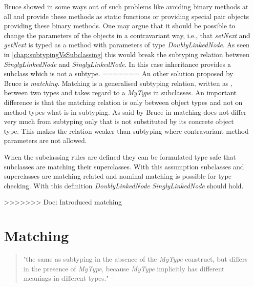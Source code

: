 Bruce showed in \cite{bruce_binary_1995} some ways out of such problems
like avoiding binary methods at all and provide these methods as static
functions or providing special pair objects providing these binary
methods. One may argue that it should be possible to change the parameters
of the objects in a contravariant way, i.e., that \emph{setNext}
and \emph{getNext} is typed as a method with parameters of type
\emph{DoublyLinkedNode}. As seen in \autoref{chap:subtypingVsSubclassing}
this would break the subtyping relation between \emph{SinglyLinkedNode}
and \emph{SinglyLinkedNode}. In this case inheritance provides a subclass
which is not a subtype.
=======
An other solution proposed by Bruce \cite{bruce_binary_1995} is \emph{matching}. Matching is a generalised subtyping
relation, written as \match, between two types and takes regard to
a \emph{MyType} in subclasses. An important difference is that the
matching relation is only between object types and not on method types
what is in subtyping. As said by Bruce in \cite{bruce_foundations_2002}
matching does not differ very much from subtyping only that \MyType is
not substituted by its concrete object type. This makes the relation weaker
than subtyping where contravariant method parameters are not allowed.

When the subclassing rules are defined they can be formulated type safe
that subclasses are matching their superclasses. With this assumption
subclasses and superclasses are matching related and nominal matching
is possible for type checking. With this definition
\emph{DoublyLinkedNode} \match \emph{SinglyLinkedNode} should hold.
 



>>>>>>> Doc: Introduced matching

\section{Matching}
\begin{quotation}
"the same as subtyping in the absence of the \emph{MyType}
construct, but differs in the presence of \emph{MyType}, because
\emph{MyType} implicitly has different meanings in different types." -
\cite{bruce_foundations_2002}
\end{quotation}

